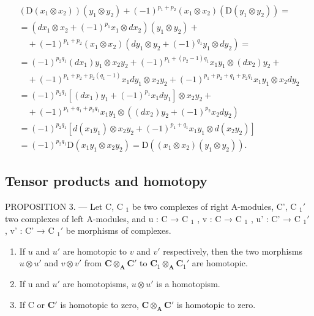 \[
\begin{array}{l} \left(\mathrm{D} (x _ {1} \otimes x _ {2})\right) (y _ {1} \otimes y _ {2}) + (- 1) ^ {p _ {1} + p _ {2}} (x _ {1} \otimes x _ {2}) (\mathrm{D} (y _ {1} \otimes y _ {2})) = \\ = (d x _ {1} \otimes x _ {2} + (- 1) ^ {p _ {1}} x _ {1} \otimes d x _ {2}) (y _ {1} \otimes y _ {2}) + \\ \quad + (- 1) ^ {p _ {1} + p _ {2}} (x _ {1} \otimes x _ {2}) (d y _ {1} \otimes y _ {2} + (- 1) ^ {q _ {1}} y _ {1} \otimes d y _ {2}) = \\ = (- 1) ^ {p _ {2} q _ {1}} (d x _ {1}) y _ {1} \otimes x _ {2} y _ {2} + (- 1) ^ {p _ {1} + (p _ {2} - 1) q _ {1}} x _ {1} y _ {1} \otimes (d x _ {2}) y _ {2} + \\ \quad + (- 1) ^ {p _ {1} + p _ {2} + p _ {2} (q _ {1} - 1)} x _ {1} d y _ {1} \otimes x _ {2} y _ {2} + (- 1) ^ {p _ {1} + p _ {2} + q _ {1} + p _ {2} q _ {1}} x _ {1} y _ {1} \otimes x _ {2} d y _ {2} \\ = (- 1) ^ {p _ {2} q _ {1}} [ (d x _ {1}) y _ {1} + (- 1) ^ {p _ {1}} x _ {1} d y _ {1} ] \otimes x _ {2} y _ {2} + \\ \quad + (- 1) ^ {p _ {1} + q _ {1} + p _ {2} q _ {1}} x _ {1} y _ {1} \otimes ((d x _ {2}) y _ {2} + (- 1) ^ {p _ {2}} x _ {2} d y _ {2}) \\ = (- 1) ^ {p _ {2} q _ {1}} [ d (x _ {1} y _ {1}) \otimes x _ {2} y _ {2} + (- 1) ^ {p _ {1} + q _ {1}} x _ {1} y _ {1} \otimes d (x _ {2} y _ {2}) ] \\ = (- 1) ^ {p _ {2} q _ {1}} \mathrm{D} (x _ {1} y _ {1} \otimes x _ {2} y _ {2}) = \mathrm{D} ((x _ {1} \otimes x _ {2}) (y _ {1} \otimes y _ {2}))  . \end{array}
\]

\subsection{Tensor products and homotopy}

PROPOSITION 3. --- Let C, C \(_{1}\) be two complexes of right A-modules, C', C \(_{1}'\) two complexes of left A-modules, and u : C → C \(_{1}\) , v : C → C \(_{1}\) , u' : C' → C \(_{1}'\) , v' : C' → C \(_{1}'\) be morphisms of complexes.

\begin{enumerate}
\def\labelenumi{\alph{enumi})}
\item
  If \(u\) and \(u'\) are homotopic to \(v\) and \(v'\) respectively, then the two morphisms \(u \otimes u'\) and \(v \otimes v'\) from \(\mathbf{C} \otimes_{\mathbf{A}} \mathbf{C}'\) to \(\mathbf{C}_1 \otimes_{\mathbf{A}} \mathbf{C}_1'\) are homotopic.
\item
  If u and \(u'\) are homotopisms, \(u \otimes u'\) is a homotopism.
\item
  If C or \(\mathbf{C}'\) is homotopic to zero, \(\mathbf{C} \otimes_{\mathbf{A}} \mathbf{C}'\) is homotopic to zero.
\end{enumerate}

